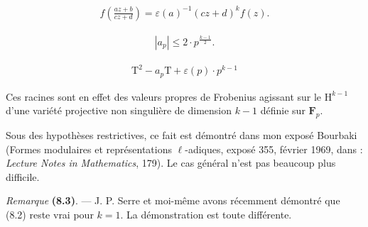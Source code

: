 \documentclass[10pt,leqno]{article}
\begin{document}
\begin{equation*}\begin{gathered}f\left(\frac{az+b}{cz+d}\right) = \varepsilon (a)^{-1}(cz+d)^{k} f(z).\end{gathered}\end{equation*}

\par

\begin{equation*}\begin{gathered}|a_{p}| \leq  2\cdot p^{\frac{k-1}{2}}.\end{gathered}\end{equation*}

\par

\begin{equation*}\begin{gathered}\mathrm{T}^{2} - a_{p} \mathrm{T} + \varepsilon (p)\cdot p^{k-1}\end{gathered}\end{equation*}

\par

\noindent Ces racines sont en effet des valeurs propres de Frobenius agissant sur le \(\mathrm{H}^{k-1}\) d'une variété projective non singulière de dimension \(k-1\) définie sur \(\mathbf{F}_{p}\).\par

\noindent Sous des hypothèses restrictives, ce fait est démontré dans mon exposé Bourbaki (Formes modulaires et représentations \(\ell \)-adiques, exposé 355, février 1969, dans : \emph{Lecture Notes in Mathematics}, 179). Le cas général n'est pas beaucoup plus difficile.\par

\noindent \emph{Remarque} \textbf{(8.3)}. — J. P. Serre et moi-même avons récemment démontré que (8.2) reste vrai pour \(k = 1\). La démonstration est toute différente.\par
\end{document}
